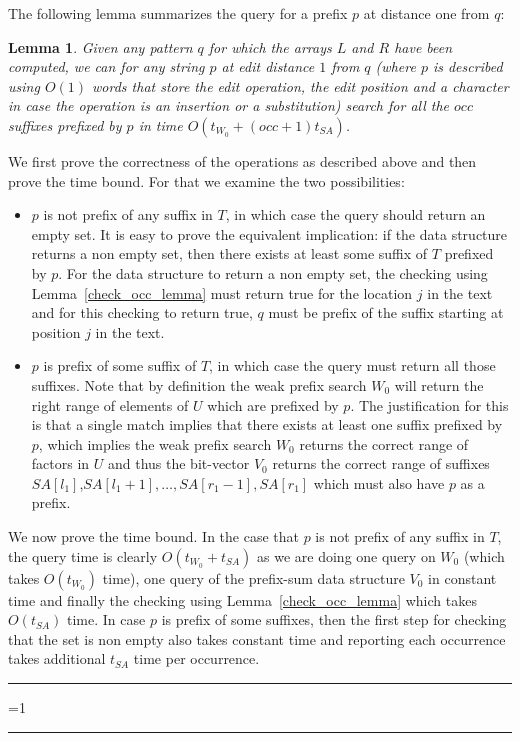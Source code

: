 \documentclass{article}
\newcommand{\?}{\mskip1.5mu}
\newtheorem{lemma}{Lemma}
\newcounter{noqed}
\newcommand{\qed}{ \ifmmode\mbox{
}\fi\rule[-.05em]{.3em}{.7em}\setcounter{noqed}{0}}
\newenvironment{proof}[1][{}]{\noindent{\bf Proof#1.
}\setcounter{noqed}{1}}{\ifnum\value{noqed}=1\qed\fi\par\medskip}
\begin{document}
The following lemma summarizes the query for a prefix $p$ at distance one from $q$: 
\begin{lemma}
\label{modif_pattern_query}
Given any pattern $q$ for which the arrays $L$ and $R$ have been computed, we can for any string $p$ at edit distance $1$ from $q$ (where $p$ is described using $O(1)$ words that store the edit operation, the edit position and a character in case the operation is an insertion or a substitution) search for all the $occ$ suffixes prefixed by $p$ in time $O(t_{W_0}+(occ+1)t_{SA})$. 
\end{lemma}
\begin{proof}
We first prove the correctness of the operations as described above and then prove the time bound. For that we examine the two possibilities: 
\begin{itemize}
\item $p$ is not prefix of any suffix in $T$, in which case the query should return an empty set. It is easy to prove the equivalent implication: if the data structure returns a non empty set, then there exists at least some suffix of $T$ prefixed by $p$. For the data structure to return a non empty set, the checking using Lemma~\ref{check_occ_lemma} must return true for the location $j$ in the text and for this checking to return true, $q$ must be prefix of the suffix starting at position $j$ in the text. 
\item $p$ is prefix of some suffix of $T$, in which case the query must return all those suffixes. Note that by definition the weak prefix search $W_0$ will return the right range of elements of $U$ which are prefixed by $p$. 
The justification for this is that a single match implies that there exists at least one suffix prefixed by $p$, which implies the weak prefix search $W_0$ returns the correct range of factors in $U$ and thus the bit-vector $V_0$ returns the correct range of suffixes $SA[l_1]$,$SA[l_1+1],\ldots,SA[r_1-1],SA[r_1]$ which must also have $p$ as a prefix. 
\end{itemize}
We now prove the time bound. In the case that $p$ is not prefix of any suffix in $T$, the query time is clearly $O(t_{W_0}+t_{SA})$ as we are doing one query on $W_0$ (which takes $O(t_{W_0})$ time), one query of the prefix-sum data structure $V_0$ in constant time and finally the checking using Lemma~\ref{check_occ_lemma} which takes $O(t_{SA})$ time. In case $p$ is prefix of some suffixes, then the first step for checking that the set is non empty also takes constant time and reporting each occurrence takes additional $t_{SA}$ time per occurrence. 
\qed
\end{proof}
\end{document}
